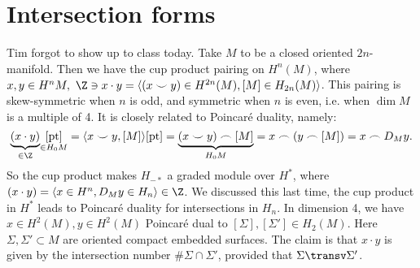 \section{Intersection forms} 
Tim forgot to show up to class today. Take $M$ to be a closed oriented $2n$-manifold. Then we have the cup product pairing on $H^n (M)$, where $x,y \in H^n M,\ \Z\ni x \cdot y = \langle (x \smile y ) \in H^{2n}(M), [M] \in H_{2n}(M) \rangle $. This pairing is skew-symmetric when $n$ is odd, and symmetric when $n$ is even, i.e. when $\dim M$ is a multiple of 4. It is closely related to Poincar\'e duality, namely: \[
    \underset{\in  \Z}{\underbrace{(x \cdot y)}}  \underset{\in H_0M}{[\mathrm{pt}]}  = \langle x \smile y, [M] \rangle [\mathrm{pt}] =\underset{H_0M}{ \underbrace{(x \smile y) \frown [M]}} = x \frown (y \frown [M]) = x\frown D_M y.
\] So the cup product makes $H_{-*}$ a graded module over $H^*$, where $(x \cdot y) = \langle x \in H^n ,D_My \in H_n  \rangle \in \Z$. We discussed this last time, the cup product in $H^*$ leads to Poincar\'e duality for intersections in $H_n $. In dimension 4, we have $x \in H^2(M), y \in H^2(M)$ Poincar\'e dual to $[\Sigma],[\Sigma'] \in H_2(M)$. Here $\Sigma,\Sigma' \subset M$ are oriented compact embedded surfaces. The claim is that $x\cdot y$ is given by the intersection number $\# \Sigma \cap \Sigma '$, provided that $\Sigma \transv \Sigma'$.


